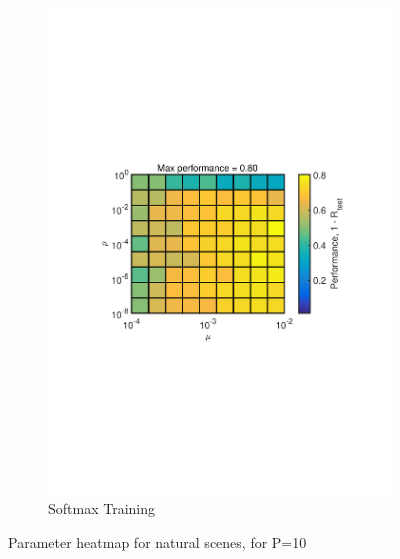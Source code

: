 \documentclass[journal,a4paper,onecolumn,11pt]{IEEEtran}
\begin{document}
\begin{figure}[!h]
\begin{subfigure}{.5\textwidth}
		\includegraphics[width=\textwidth]{para_opt_uppercasechar_sm.pdf}
		\caption{Softmax Training}
		\label{fig:para_opt_uppercasechar_sm}
	\end{subfigure}%
	\caption{Parameter heatmap for natural scenes, for P=10}
	\label{fig:heatmap_naturalscene}
\end{figure}
\end{document}
